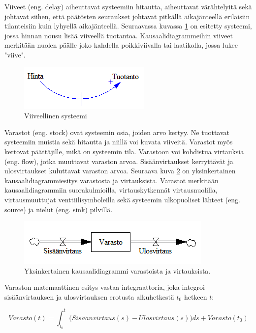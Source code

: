 \documentclass[finnish,12pt,a4paper,pdftex]{article}
\begin{document}
\begin{onehalfspacing}
Viiveet (eng. delay) aiheuttavat systeemiin hitautta, aiheuttavat värähtelyitä sekä johtavat siihen, että päätösten seuraukset johtavat pitkällä aikajänteellä erilaisiin tilanteisiin kuin lyhyellä aikajänteellä. Seuraavassa kuvassa \ref{sysdyn:viive} on esitetty systeemi, jossa hinnan nousu lisää viiveellä tuotantoa. Kausaalidiagrammeihin viiveet merkitään nuolen päälle joko kahdella poikkiviivalla tai laatikolla, jossa lukee "viive". \cite[s. 150--152]{Sterman2000} 

\begin{figure}[H]
\centering \includegraphics{viive}
\caption{Viiveellinen systeemi \cite[s. 150]{Sterman2000} \label{sysdyn:viive}}
\end{figure}

Varastot (eng. stock) ovat systeemin osia, joiden arvo kertyy. Ne tuottavat systeemiin muistia sekä hitautta ja niillä voi kuvata viiveitä. Varastot myös kertovat päättäjille, mikä on systeemin tila. Varastoon voi kohdistua virtauksia (eng. flow), jotka muuttavat varaston arvoa. Sisäänvirtaukset kerryttävät ja ulosvirtaukset kuluttavat varaston arvoa. Seuraava kuva \ref{sysdyn:varastovirtaus} on yksinkertainen kausaalidiagrammiesitys varastosta ja virtauksista. Varastot merkitään kausaalidiagrammiin suorakulmioilla, virtauskytkennät virtausnuolilla, virtausmuuttujat venttiilisymboleilla sekä systeemin ulkopuoliset lähteet (eng. source) ja nielut (eng. sink) pilvillä. \cite[s. 191--197]{Sterman2000} 

\begin{figure}[H]
\centering \includegraphics{varastovirtaus}
\caption{Yksinkertainen kausaalidiagrammi varastoista ja virtauksista. \cite[s. 150]{Sterman2000} \label{sysdyn:varastovirtaus}}
\end{figure}

Varaston matemaattinen esitys vastaa integraattoria, joka integroi sisäänvirtauksen ja ulosvirtauksen erotusta alkuhetkestä $t_0$ hetkeen $t$: 

\begin{equation}
  Varasto(t) = \int_{t_0}^t \Big( Sis\ddot{a}\ddot{a}nvirtaus(s) - Ulosvirtaus(s) \Big) ds + Varasto(t_0)
\end{equation} \cite[s. 194--195]{Sterman2000} 


\end{onehalfspacing}
\end{document}
